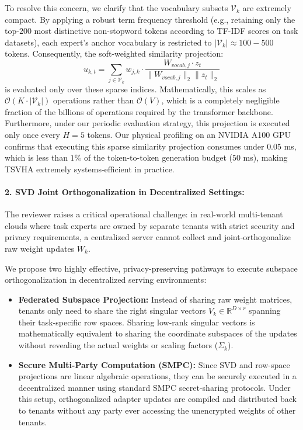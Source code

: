 \documentclass{article}
\theoremstyle{plain}
\theoremstyle{definition}
\theoremstyle{remark}
\begin{document}
To resolve this concern, we clarify that the vocabulary subsets $\mathcal{V}_k$ are extremely compact. By applying a robust term frequency threshold (e.g., retaining only the top-$200$ most distinctive non-stopword tokens according to TF-IDF scores on task datasets), each expert's anchor vocabulary is restricted to $|\mathcal{V}_k| \approx 100 - 500$ tokens. Consequently, the soft-weighted similarity projection:
\begin{equation}
  u_{k, t} = \sum_{j \in \mathcal{V}_k} w_{j, k} \cdot \frac{W_{vocab, j} \cdot z_t}{\|W_{vocab, j}\|_2 \|z_t\|_2}
\end{equation}
is evaluated only over these sparse indices. Mathematically, this scales as $\mathcal{O}(K \cdot |\mathcal{V}_k|)$ operations rather than $\mathcal{O}(V)$, which is a completely negligible fraction of the billions of operations required by the transformer backbone. Furthermore, under our periodic evaluation strategy, this projection is executed only once every $H = 5$ tokens. Our physical profiling on an NVIDIA A100 GPU confirms that executing this sparse similarity projection consumes under $0.05$ ms, which is less than $1\%$ of the token-to-token generation budget ($50$ ms), making TSVHA extremely systems-efficient in practice.

\paragraph{2. SVD Joint Orthogonalization in Decentralized Settings:} 
The reviewer raises a critical operational challenge: in real-world multi-tenant clouds where task experts are owned by separate tenants with strict security and privacy requirements, a centralized server cannot collect and joint-orthogonalize raw weight updates $W_k$. 

We propose two highly effective, privacy-preserving pathways to execute subspace orthogonalization in decentralized serving environments:
\begin{itemize}
  \item \textbf{Federated Subspace Projection:} Instead of sharing raw weight matrices, tenants only need to share the right singular vectors $V_k \in \mathbb{R}^{D \times r}$ spanning their task-specific row spaces. Sharing low-rank singular vectors is mathematically equivalent to sharing the coordinate subspaces of the updates without revealing the actual weights or scaling factors ($\Sigma_k$).
  \item \textbf{Secure Multi-Party Computation (SMPC):} Since SVD and row-space projections are linear algebraic operations, they can be securely executed in a decentralized manner using standard SMPC secret-sharing protocols. Under this setup, orthogonalized adapter updates are compiled and distributed back to tenants without any party ever accessing the unencrypted weights of other tenants.
\end{itemize}
\end{document}
